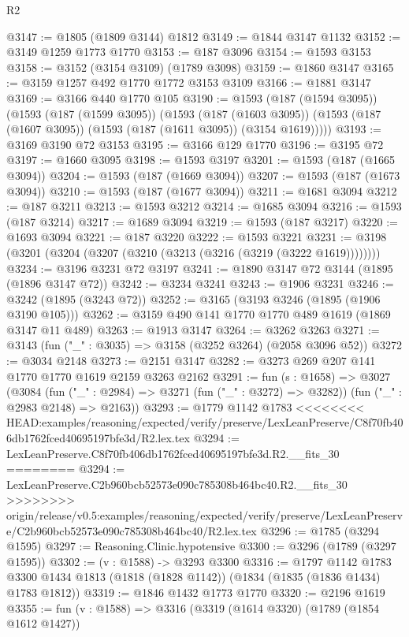 \begin{lexlean}{R2}
\begin{coremodule}
{{{{{{{{{{{{{{{{{{{{{{{{{{{{{{{{{{{{{{{{{{{{{{{{{{{{{{{{{{{{{{{{{{{{{{{{{{{{{{{{{{{{{{{{{{{{@3147 := @1805 (@1809 @3144) @1812
@3149 := @1844 @3147 @1132
@3152 := @3149 @1259 @1773 @1770
@3153 := @187 @3096
@3154 := @1593 @3153
@3158 := @3152 (@3154 @3109) (@1789 @3098)
@3159 := @1860 @3147
@3165 := @3159 @1257 @492 @1770 @1772 @3153 @3109
@3166 := @1881 @3147
@3169 := @3166 @440 @1770 @105
@3190 := @1593
    (@187 (@1594 @3095))
    (@1593
      (@187 (@1599 @3095))
      (@1593
        (@187 (@1603 @3095))
        (@1593 (@187 (@1607 @3095)) (@1593 (@187 (@1611 @3095)) (@3154 @1619)))))
@3193 := @3169 @3190 @72 @3153
@3195 := @3166 @129 @1770
@3196 := @3195 @72
@3197 := @1660 @3095
@3198 := @1593 @3197
@3201 := @1593 (@187 (@1665 @3094))
@3204 := @1593 (@187 (@1669 @3094))
@3207 := @1593 (@187 (@1673 @3094))
@3210 := @1593 (@187 (@1677 @3094))
@3211 := @1681 @3094
@3212 := @187 @3211
@3213 := @1593 @3212
@3214 := @1685 @3094
@3216 := @1593 (@187 @3214)
@3217 := @1689 @3094
@3219 := @1593 (@187 @3217)
@3220 := @1693 @3094
@3221 := @187 @3220
@3222 := @1593 @3221
@3231 := @3198 (@3201 (@3204 (@3207 (@3210 (@3213 (@3216 (@3219 (@3222 @1619))))))))
@3234 := @3196 @3231 @72 @3197
@3241 := @1890 @3147 @72 @3144 (@1895 (@1896 @3147 @72))
@3242 := @3234 @3241
@3243 := @1906 @3231
@3246 := @3242 (@1895 (@3243 @72))
@3252 := @3165 (@3193 @3246 (@1895 (@1906 @3190 @105)))
@3262 := @3159 @490 @141 @1770 @1770 @489 @1619 (@1869 @3147 @11 @489)
@3263 := @1913 @3147
@3264 := @3262 @3263
@3271 := @3143 (fun ("_" : @3035) => @3158 (@3252 @3264) (@2058 @3096 @52))
@3272 := @3034 @2148
@3273 := @2151 @3147
@3282 := @3273 @269 @207 @141 @1770 @1770 @1619 @2159 @3263 @2162
@3291 := fun (s : @1658) =>
  @3027
    (@3084
      (fun ("_" : @2984) => @3271 (fun ("_" : @3272) => @3282))
      (fun ("_" : @2983 @2148) => @2163))
@3293 := @1779 @1142 @1783
<<<<<<<< HEAD:examples/reasoning/expected/verify/preserve/LexLeanPreserve/C8f70fb406db1762fced40695197bfe3d/R2.lex.tex
@3294 := LexLeanPreserve.C8f70fb406db1762fced40695197bfe3d.R2.__fits_30
========
@3294 := LexLeanPreserve.C2b960bcb52573e090c785308b464bc40.R2.__fits_30
>>>>>>>> origin/release/v0.5:examples/reasoning/expected/verify/preserve/LexLeanPreserve/C2b960bcb52573e090c785308b464bc40/R2.lex.tex
@3296 := @1785 (@3294 @1595)
@3297 := Reasoning.Clinic.hypotensive
@3300 := @3296 (@1789 (@3297 @1595))
@3302 := (v : @1588) -> @3293 @3300
@3316 := @1797
    @1142
    @1783
    @3300
    @1434
    @1813
    (@1818 (@1828 @1142))
    (@1834 (@1835 (@1836 @1434) @1783 @1812))
@3319 := @1846 @1432 @1773 @1770
@3320 := @2196 @1619
@3355 := fun (v : @1588) =>
  @3316
    (@3319
      (@1614 @3320)
      (@1789 (@1854 @1612 @1427))
}}}}}}}}}}}}}}}}}}}}}}}}}}}}}}}}}}}}}}}}}}}}}}}}}}}}}}}}}}}}}}}}}}}}}}}}}}}}}}}}}}}}}}}}}}}}
\end{coremodule}
\end{lexlean}
